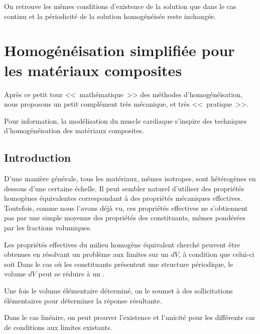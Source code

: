 On retrouve les mêmes conditions d'existence de la solution que dans le cas
continu et la périodicité de la solution homogénéisée reste inchangée.



\medskip
\section{Homogénéisation simplifiée pour les matériaux composites}

Après ce petit tour <<~mathématique~>> des méthodes d'homogénéisation,
nous proposons un petit complément très mécanique, et très <<~pratique~>>.

\medskip
Pour information, la modélisation du muscle cardiaque s'inspire des techniques d'homogénéisation
des matériaux composites.


\medskip
\subsection{Introduction}

D'une manière générale, tous les matériaux, mêmes isotropes, sont hétérogènes
en dessous d'une certaine échelle.
Il peut sembler naturel d'utiliser des propriétés homogènes équivalentes correspondant
à des propriétés mécaniques effectives.
Toutefois, comme nous l'avons déjà vu, ces propriétés effectives ne s'obtiennent pas par
une simple moyenne des propriétés des constituants, mêmes  pondérées par les fractions
volumiques.

\medskip
Les propriétés effectives du milieu homogène équivalent cherché peuvent être obtenues
en résolvant un problème aux limites sur un  $dV$, à condition
que celui-ci soit 
Dans le cas où les constituants présentent une structure périodique, le volume $dV$ peut se
réduire à un .

\medskip
Une fois le volume élémentaire déterminé, on le soumet à des sollicitations élémentaires
pour déterminer la réponse résultante. 

\medskip
Dans le cas linéaire, on peut prouver l'existence et l'unicité pour les différents cas de
conditions aux limites existants.


